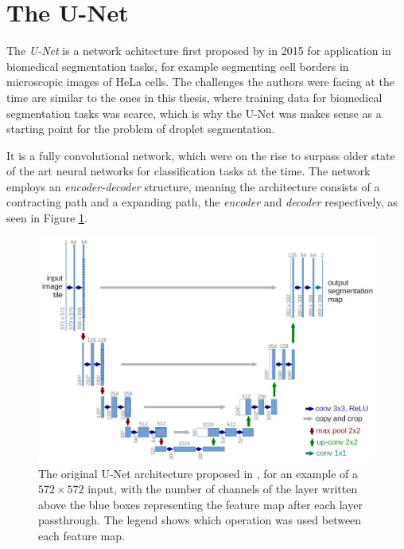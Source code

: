 \section{The U-Net}

The \emph{U-Net} is a network achitecture first proposed by \cite{ronnebergerUNetConvolutionalNetworks2015} in 2015 for application in biomedical segmentation tasks, for example segmenting cell borders in microscopic images of HeLa cells. 
The challenges the authors were facing at the time are similar to the ones in this thesis, where training data for biomedical segmentation tasks was scarce, which is why the U-Net was makes sense as a starting point for the problem of droplet segmentation.

It is a fully convolutional network, which were on the rise to surpass older state of the art neural networks for classification tasks at the time. 
The network employs an \emph{encoder-decoder} structure, meaning the architecture consists of a contracting path and a expanding path, the \emph{encoder} and \emph{decoder} respectively, as seen in Figure \ref{fig:unet}.

\begin{figure}[htbp]
    \includegraphics[width=\textwidth]{images/unet.png}
    \caption{The original U-Net architecture proposed in \cite{ronnebergerUNetConvolutionalNetworks2015}, for an example of a $572\times 572$ input, with the number of channels of the layer written above the blue boxes representing the feature map after each layer passthrough. The legend shows which operation was used between each feature map.}
    \label{fig:unet}
\end{figure}

